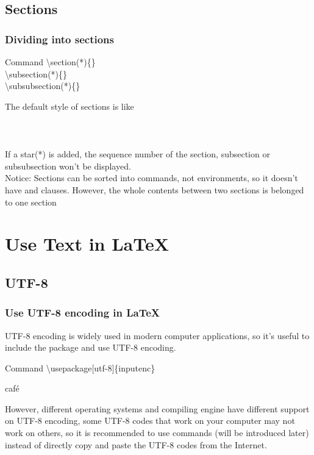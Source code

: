 \documentclass{beamer}
\newenvironment{command}{\begin{block}{Command}}{\end{block}}
\begin{document}
\subsection{Sections}

\begin{frame}
	\frametitle{Dividing into sections}
	\begin{command}
		\alert{\textbackslash section(*)}\{\}\\
		\alert{\textbackslash subsection(*)}\{\}\\
		\alert{\textbackslash subsubsection(*)}\{\}\\
	\end{command}
	The default style of sections is like\\
	\\
	\\
	\\[0.5em]
	If a star(\alert{*}) is added, the sequence number of the section, subsection or subsubsection won't be displayed.\\
	\alert{Notice:} Sections can be sorted into commands, not environments, so it doesn't have  and  clauses. However, the whole contents between two sections is belonged to one section
\end{frame}

\section{Use Text in \LaTeX}
\begin{frame}
\end{frame}

\subsection{UTF-8}

\begin{frame}
	\frametitle{Use UTF-8 encoding in \LaTeX}
	UTF-8 encoding is widely used in modern computer applications, so it's useful to include the  package and use UTF-8 encoding.
	\begin{command}
		\alert{\textbackslash usepackage}[utf-8]\{inputenc\}
	\end{command}
	\begin{example}
		café
	\end{example}
	However, different operating systems and compiling engine have different support on UTF-8 encoding, some UTF-8 codes that work on your computer may not work on others, so it is recommended to use commands (will be introduced later) instead of directly copy and paste the UTF-8 codes from the Internet.
\end{frame}
\end{document}
